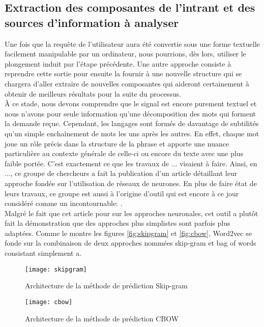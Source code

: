 \subsection{Extraction des composantes de l'intrant et des sources d'information à analyser}
Une fois que la requête de l'utilisateur aura été convertie sous une forme textuelle facilement manipulable par un ordinateur, nous pourrions, dès lors, utiliser le plongement induit par l'étape précédente. Une autre approche consiste à reprendre cette sortie pour ensuite la fournir à une nouvelle structure qui se chargera d'aller extraire de nouvelles composantes qui aideront certainement à obtenir de meilleurs résultats pour la suite du processus. \\

À ce stade, nous devons comprendre que le signal est encore purement textuel et nous n'avons pour seule information qu'une décomposition des mots qui forment la demande reçue. Cependant, les langages sont formés de davantage de subtilités qu'un simple enchaînement de mots les uns après les autres. En effet, chaque mot joue un rôle précis dans la structure de la phrase et apporte une nuance particulière au contexte générale de celle-ci ou encore du texte avec une plus faible portée. C'est exactement ce que les travaux de ... visaient à faire. Ainsi, en ..., ce groupe de chercheurs a fait la publication d'un article détaillant leur approche fondée sur l'utilisation de réseaux de neurones. En plus de faire état de leurs travaux, ce groupe est aussi à l'origine d'outil qui est encore à ce jour considéré comme un incontournable: \cite{word2vec}. \\

Malgré le fait que cet article pour sur les approches neuronales, cet outil a plutôt fait la démonstration que des approches plus simplistes sont parfois plus adaptées. Comme le montre les figures \autoref{fig:skipgram} et \autoref{fig:cbow}, Word2vec se fonde sur la combinaison de deux approches nommées skip-gram et bag of words consistant simplement a. \\

\begin{figure}[ht]
  \centering
  \texttt{[image: skipgram]}
  \caption{Architecture de la méthode de prédiction Skip-gram}
  \label{fig:skipgram}
\end{figure}

\begin{figure}[ht]
  \centering
  \texttt{[image: cbow]}
  \caption{Architecture de la méthode de prédiction CBOW}
  \label{fig:cbow}
\end{figure}

